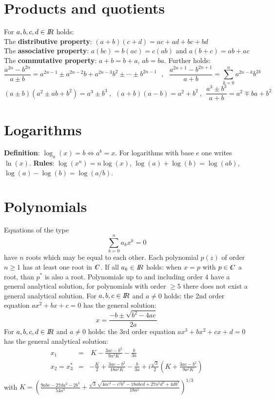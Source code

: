\documentclass[a4paper,fancyheadings,twoside]{report}
\begin{document}
\section{Products and quotients}
For $a,b,c,d\in I\hspace{-1mm}R$ holds:\\
The {\bf distributive property}: $(a+b)(c+d)=ac+ad+bc+bd$\\
The {\bf associative property}: $a(bc)=b(ac)=c(ab)$ and $a(b+c)=ab+ac$\\
The {\bf commutative property}: $a+b=b+a$, $ab=ba$.
\npar
Further holds:
\[
\frac{a^{2n}-b^{2n}}{a\pm b}=a^{2n-1}\pm a^{2n-2}b+a^{2n-3}b^2\pm\cdots\pm b^{2n-1}~~~,~~~
\frac{a^{2n+1}-b^{2n+1}}{a+b}=\sum_{k=0}^n a^{2n-k}b^{2k}
\]
\[
(a\pm b)(a^2\pm ab+b^2)=a^3\pm b^3~,~~(a+b)(a-b)=a^2+b^2~,~~
\frac{a^3\pm b^3}{a+b}=a^2\mp ba+b^2
\]

\section{Logarithms}
{\bf Definition}: $\log_a(x)=b\Leftrightarrow a^b=x$. For logarithms with
base $e$ one writes $\ln(x)$.
\npar
{\bf Rules}: $\log(x^n)=n\log(x)$, $\log(a)+\log(b)=\log(ab)$, $\log(a)-\log(b)=\log(a/b)$.

\section{Polynomials}
Equations of the type
\[
\sum_{k=0}^n a_kx^k=0
\]
have $n$ roots which may be equal to each other. Each polynomial $p(z)$ of order
$n\geq1$ has at least one root in $\CC$. If all $a_k\in I\hspace{-1mm}R$ holds: when
$x=p$ with $p\in\CC$ a root, than $p^*$ is also a root. Polynomials up to and
including order 4 have a general analytical solution, for polynomials with
order $\geq5$ there does not exist a general analytical solution.
\npar
For $a,b,c\in I\hspace{-1mm}R$ and $a\neq0$ holds:
the 2nd order equation $ax^2+bx+c=0$ has the general solution:
\[
x=\frac{-b\pm\sqrt{b^2-4ac}}{2a}
\]
For $a,b,c,d\in I\hspace{-1mm}R$ and $a\neq0$ holds:
the 3rd order equation $ax^3+bx^2+cx+d=0$ has the general analytical solution:
\begin{eqnarray*}
x_1&=&~K-\frac{3ac-b^2}{9a^2K}-\frac{b}{3a}\\
x_2=x_3^*&=&-\frac{K}{2}+\frac{3ac-b^2}{18a^2K}-\frac{b}{3a}+i\frac{\sqrt{3}}{2}\left(K+\frac{3ac-b^2}{9a^2K}\right)\\
\end{eqnarray*}
with $\displaystyle K=\left(\frac{9abc-27da^2-2b^3}{54a^3}+
\frac{\sqrt{3}\,\sqrt{4ac^3-c^2b^2-18abcd+27a^2d^2+4db^3}}{18a^2}\right)^{1/3}$
\end{document}
